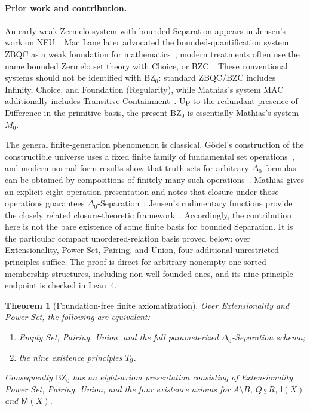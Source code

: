 \documentclass[11pt,a4paper]{article}
\numberwithin{equation}{section}
\newtheorem{theorem}{Theorem}[section]
\newcommand{\Comp}{\mathbin{\underline{\circ}}}
\newcommand{\Int}{\mathsf{I}}
\newcommand{\Mem}{\mathsf{M}}
\newcommand{\Dzero}{\Delta_0}
\newcommand{\Tnine}{T_9}
\begin{document}
\paragraph{Prior work and contribution.}
An early weak Zermelo system with bounded Separation appears in Jensen's work on NFU~\cite{Jensen1968}.  Mac Lane later advocated the bounded-quantification system ZBQC as a weak foundation for mathematics~\cite{MacLane1986}; modern treatments often use the name bounded Zermelo set theory with Choice, or BZC~\cite{Shulman2019}.  These conventional systems should not be identified with $\mathrm{BZ}_0$: standard ZBQC/BZC includes Infinity, Choice, and Foundation (Regularity), while Mathias's system MAC additionally includes Transitive Containment~\cite[Sec.~0]{Mathias2001}.  Up to the redundant presence of Difference in the primitive basis, the present $\mathrm{BZ}_0$ is essentially Mathias's system $M_0$.

The general finite-generation phenomenon is classical.  G\"odel's construction of the constructible universe uses a fixed finite family of fundamental set operations~\cite{Godel1940}, and modern normal-form results show that truth sets for arbitrary $\Dzero$ formulas can be obtained by compositions of finitely many such operations~\cite[Theorem~13.4 and Corollary~13.5]{Jech2003}.  Mathias gives an explicit eight-operation presentation and notes that closure under those operations guarantees $\Dzero$-Separation~\cite[Sec.~4]{Mathias2001}; Jensen's rudimentary functions provide the closely related closure-theoretic framework~\cite[Sec.~1]{Jensen1972}.  Accordingly, the contribution here is not the bare existence of some finite basis for bounded Separation.  It is the particular compact unordered-relation basis proved below: over Extensionality, Power Set, Pairing, and Union, four additional unrestricted principles suffice.  The proof is direct for arbitrary nonempty one-sorted membership structures, including non-well-founded ones, and its nine-principle endpoint is checked in Lean~4.

\begin{theorem}[Foundation-free finite axiomatization]\label{thm:main}
Over Extensionality and Power Set, the following are equivalent:
\begin{enumerate}[label=(\roman*),leftmargin=2.6em]
\item Empty Set, Pairing, Union, and the full parameterized $\Dzero$-Separation schema;
\item the nine existence principles $\Tnine$.
\end{enumerate}
Consequently $\mathrm{BZ}_0$ has an eight-axiom presentation consisting of Extensionality, Power Set, Pairing, Union, and the four existence axioms for $A\setminus B$, $Q\Comp R$, $\Int(X)$ and $\Mem(X)$.
\end{theorem}
\end{document}
